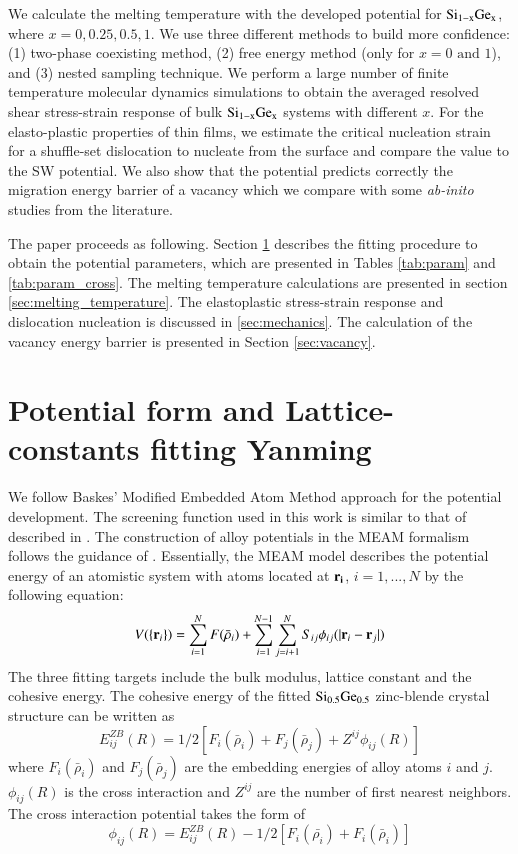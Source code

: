 \documentclass[review]{elsarticle}
\begin{document}
We calculate the melting temperature with the developed potential for ${\rm Si_{1-x}Ge_x}$, where $x=0,0.25,0.5,1$. We use three different methods to build more confidence: (1) two-phase coexisting method, (2) free energy method (only for $x=0{\text{ and }}1$), and (3) nested sampling technique. We perform a large number of finite temperature molecular dynamics simulations to obtain the averaged resolved shear stress-strain response of bulk ${\rm Si_{1-x}Ge_x}$ systems with different $x$. For the elasto-plastic properties of thin films, we estimate the critical nucleation strain for a shuffle-set dislocation to nucleate from the surface and compare the value to the SW potential. We also show that the potential predicts correctly the migration energy barrier of a vacancy which we compare with some {\it ab-inito} studies from the literature. 

The paper proceeds as following. Section \ref{sec:lattice} describes the fitting procedure to obtain the potential parameters, which are presented in Tables \ref{tab:param} and \ref{tab:param_cross}. The melting temperature calculations are presented in section \ref{sec:melting_temperature}. The elastoplastic stress-strain response and dislocation nucleation is discussed in \ref{sec:mechanics}. The calculation of the  vacancy energy barrier is presented in Section \ref{sec:vacancy}. 

\section{Potential form and Lattice-constants fitting  {\color{red} Yanming}}
\label{sec:lattice}

We follow Baskes' Modified Embedded Atom Method approach \cite{baskes1992modified} for the potential development. The screening function used in this work is similar to that of described in \cite{baskes1997determination}. The construction of alloy potentials in the MEAM formalism follows the guidance of \cite{lee2001second}.  Essentially, the MEAM model describes the potential energy of an atomistic system with atoms located at $\bf r_i$, $i =1,...,N$ by the following equation:
\begin{equation}
V(\{ {\bf r}_i \}) = \sum^N_{i=1} F(\bar{\rho}_i) + \sum^{N-1}_{i=1}\sum^N_{j=i+1} S_{ij}\phi_{ij}(|{\bf r}_i-{\bf r}_j|)
\end{equation}
The three fitting targets include the bulk modulus, lattice constant and the cohesive energy. 
The cohesive energy of the fitted $\rm Si_{0.5}Ge_{0.5}$ zinc-blende crystal structure can be written as 
\begin{equation}
E^{ZB}_{ij} (R)   = 1/2 \left[ F_i(\bar{\rho}_i) + F_j(\bar{\rho}_j) + Z^{ij} \phi_{ij} (R) \right]
\end{equation}
where $F_i(\bar{\rho}_i)$ and $ F_j(\bar{\rho}_j)$ are the embedding energies of alloy atoms $i$ and $j$.  $\phi_{ij} (R)$ is the cross interaction and $Z^{ij}$ are the number of first nearest neighbors. The cross interaction potential takes the form of
\begin{equation}
\phi_{ij}(R) = E^{ZB}_{ij}(R) - 1/2\left[ F_i (\bar{\rho_i}) + F_i (\bar{\rho}_i)\right ]
\end{equation}
\end{document}
